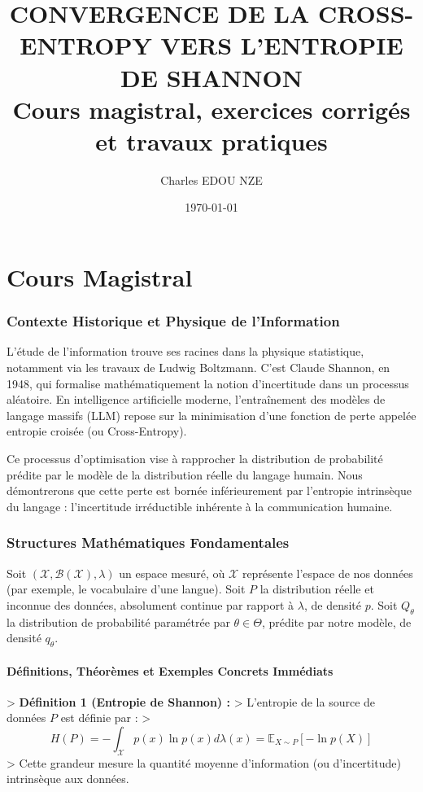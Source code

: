 \documentclass[11pt,a4paper]{article}
\title{\Huge CONVERGENCE DE LA CROSS-ENTROPY VERS L'ENTROPIE DE SHANNON \\ \large Cours magistral, exercices corrigés et travaux pratiques}
\author{\Large Charles EDOU NZE}
\date{\today}
\begin{document}
\maketitle
\tableofcontents
\newpage

\part{Cours Magistral}


\section{Contexte Historique et Physique de l'Information}

L'étude de l'information trouve ses racines dans la physique statistique, notamment via les travaux de Ludwig Boltzmann. C'est Claude Shannon, en 1948, qui formalise mathématiquement la notion d'incertitude dans un processus aléatoire. En intelligence artificielle moderne, l'entraînement des modèles de langage massifs (LLM) repose sur la minimisation d'une fonction de perte appelée entropie croisée (ou Cross-Entropy).

Ce processus d'optimisation vise à rapprocher la distribution de probabilité prédite par le modèle de la distribution réelle du langage humain. Nous démontrerons que cette perte est bornée inférieurement par l'entropie intrinsèque du langage : l'incertitude irréductible inhérente à la communication humaine.

\section{Structures Mathématiques Fondamentales}

Soit $(\mathcal{X}, \mathcal{B}(\mathcal{X}), \lambda)$ un espace mesuré, où $\mathcal{X}$ représente l'espace de nos données (par exemple, le vocabulaire d'une langue). Soit $P$ la distribution réelle et inconnue des données, absolument continue par rapport à $\lambda$, de densité $p$. Soit $Q_\theta$ la distribution de probabilité paramétrée par $\theta \in \Theta$, prédite par notre modèle, de densité $q_\theta$.

\subsection{Définitions, Théorèmes et Exemples Concrets Immédiats}

> \textbf{Définition 1 (Entropie de Shannon) :}
> L'entropie de la source de données $P$ est définie par :
> $$H(P) = - \int_{\mathcal{X}} p(x) \ln p(x) d\lambda(x) = \mathbb{E}_{X \sim P}[-\ln p(X)]$$
> Cette grandeur mesure la quantité moyenne d'information (ou d'incertitude) intrinsèque aux données.
\end{document}
